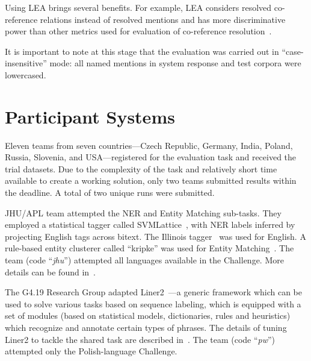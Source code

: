 \documentclass[11pt]{article}
\newcommand{\comment}[1]{}
\begin{document}
Using LEA brings several benefits.  For example, LEA considers resolved
co-reference relations instead of resolved mentions and has more
discriminative power than other metrics used for evaluation of
co-reference resolution~\cite{DBLP:conf-acl-Moosavi016}.

It is important to note at this stage that the evaluation was carried out
in ``case-insensitive'' mode: all named mentions in system response and
test corpora were lowercased.


\section{Participant Systems}
\label{sec:participants}
 
Eleven teams from seven countries---Czech Republic, Germany, India,
Poland, Russia, Slovenia, and USA---registered for the evaluation task and
received the trial datasets.  Due to the complexity of the task and
relatively short time available to create a working solution, only two
teams submitted results within the deadline.  A total of two unique runs
were submitted.

JHU/APL team attempted the NER and Entity Matching sub-tasks.  They
employed a statistical tagger called
SVMLattice~\cite{Mayfield:2003:LTU:956863.956921}, with NER labels
inferred by projecting English tags across bitext.  The Illinois
tagger~\cite{Ratinov:2009:DCM:1596374.1596399} was used for English. A
rule-based entity clusterer called ``kripke'' was used for Entity
Matching~\cite{DBLP:conf/tac/McNameeMFL13}.
%
The team (code ``{\em jhu}'') attempted all languages available in the
Challenge. More details can be found in~\cite{mayfield:2017}.

The {G4.19 Research Group} adapted
Liner2~\cite{series/sci/MarcinczukKJ13}---a generic framework which can
be used to solve various tasks based on sequence labeling, which is
equipped with a set of modules (based on statistical models,
dictionaries, rules and heuristics) which recognize and annotate certain
types of phrases.  The details of tuning Liner2 to tackle the shared task
are described in~\cite{marcinczuk:2017}.
%
The team (code ``{\em pw}'') attempted only the Polish-language Challenge.

\comment{
The {\sc DeepNLP} team\footnote{\tt https://github.com/tindzk/bsnlp}
learns entities and their base forms from Wikipedia data
dumps.\footnote{\tt https://dumps.wikimedia.org/} A character-level
recurrent neural network~\cite{DBLP:conf/aaai/KimJSR16} is trained to
predict which characters belong to an entity. A second neural network is
trained on inflected entities and predicts their base forms.
}
\end{document}
